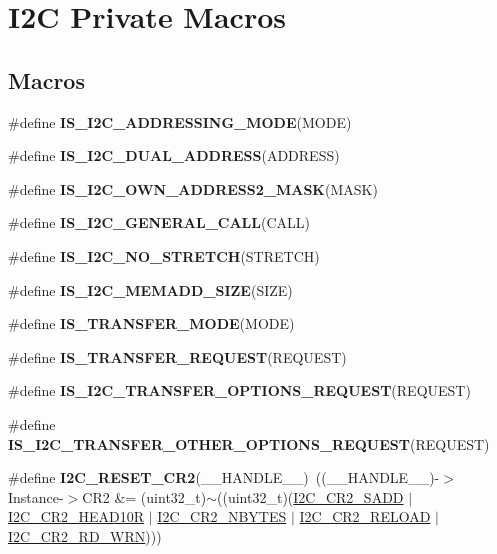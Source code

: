 \hypertarget{group___i2_c___private___macro}{}\section{I2C Private Macros}
\label{group___i2_c___private___macro}
\subsection*{Macros}
\begin{DoxyCompactItemize}
\item 
\#define {\bfseries I\+S\+\_\+\+I2\+C\+\_\+\+A\+D\+D\+R\+E\+S\+S\+I\+N\+G\+\_\+\+M\+O\+DE}(M\+O\+DE)
\item 
\#define {\bfseries I\+S\+\_\+\+I2\+C\+\_\+\+D\+U\+A\+L\+\_\+\+A\+D\+D\+R\+E\+SS}(A\+D\+D\+R\+E\+SS)
\item 
\#define {\bfseries I\+S\+\_\+\+I2\+C\+\_\+\+O\+W\+N\+\_\+\+A\+D\+D\+R\+E\+S\+S2\+\_\+\+M\+A\+SK}(M\+A\+SK)
\item 
\#define {\bfseries I\+S\+\_\+\+I2\+C\+\_\+\+G\+E\+N\+E\+R\+A\+L\+\_\+\+C\+A\+LL}(C\+A\+LL)
\item 
\#define {\bfseries I\+S\+\_\+\+I2\+C\+\_\+\+N\+O\+\_\+\+S\+T\+R\+E\+T\+CH}(S\+T\+R\+E\+T\+CH)
\item 
\#define {\bfseries I\+S\+\_\+\+I2\+C\+\_\+\+M\+E\+M\+A\+D\+D\+\_\+\+S\+I\+ZE}(S\+I\+ZE)
\item 
\#define {\bfseries I\+S\+\_\+\+T\+R\+A\+N\+S\+F\+E\+R\+\_\+\+M\+O\+DE}(M\+O\+DE)
\item 
\#define {\bfseries I\+S\+\_\+\+T\+R\+A\+N\+S\+F\+E\+R\+\_\+\+R\+E\+Q\+U\+E\+ST}(R\+E\+Q\+U\+E\+ST)
\item 
\#define {\bfseries I\+S\+\_\+\+I2\+C\+\_\+\+T\+R\+A\+N\+S\+F\+E\+R\+\_\+\+O\+P\+T\+I\+O\+N\+S\+\_\+\+R\+E\+Q\+U\+E\+ST}(R\+E\+Q\+U\+E\+ST)
\item 
\#define {\bfseries I\+S\+\_\+\+I2\+C\+\_\+\+T\+R\+A\+N\+S\+F\+E\+R\+\_\+\+O\+T\+H\+E\+R\+\_\+\+O\+P\+T\+I\+O\+N\+S\+\_\+\+R\+E\+Q\+U\+E\+ST}(R\+E\+Q\+U\+E\+ST)
\item 
\mbox{\label{group___i2_c___private___macro_ga84085a3fd5b43f29ec449d86560a9378}} 
\#define {\bfseries I2\+C\+\_\+\+R\+E\+S\+E\+T\+\_\+\+C\+R2}(\+\_\+\+\_\+\+H\+A\+N\+D\+L\+E\+\_\+\+\_\+)~((\+\_\+\+\_\+\+H\+A\+N\+D\+L\+E\+\_\+\+\_\+)-\/$>$Instance-\/$>$C\+R2 \&= (uint32\+\_\+t)$\sim$((uint32\+\_\+t)(\mbox{\hyperlink{group___peripheral___registers___bits___definition_ga1a0478d3d85fc6aba608390ee2ea2d1c}{I2\+C\+\_\+\+C\+R2\+\_\+\+S\+A\+DD}} $\vert$ \mbox{\hyperlink{group___peripheral___registers___bits___definition_ga2de0f12e6fb297c2c29bee5504e54377}{I2\+C\+\_\+\+C\+R2\+\_\+\+H\+E\+A\+D10R}} $\vert$ \mbox{\hyperlink{group___peripheral___registers___bits___definition_ga23a58895a897ccc34a8cbbe36b412b69}{I2\+C\+\_\+\+C\+R2\+\_\+\+N\+B\+Y\+T\+ES}} $\vert$ \mbox{\hyperlink{group___peripheral___registers___bits___definition_ga21a796045451013c964ef8b12ca6c9bb}{I2\+C\+\_\+\+C\+R2\+\_\+\+R\+E\+L\+O\+AD}} $\vert$ \mbox{\hyperlink{group___peripheral___registers___bits___definition_ga268ec714bbe4a75ea098c0e230a87697}{I2\+C\+\_\+\+C\+R2\+\_\+\+R\+D\+\_\+\+W\+RN}})))

\end{DoxyCompactItemize}
